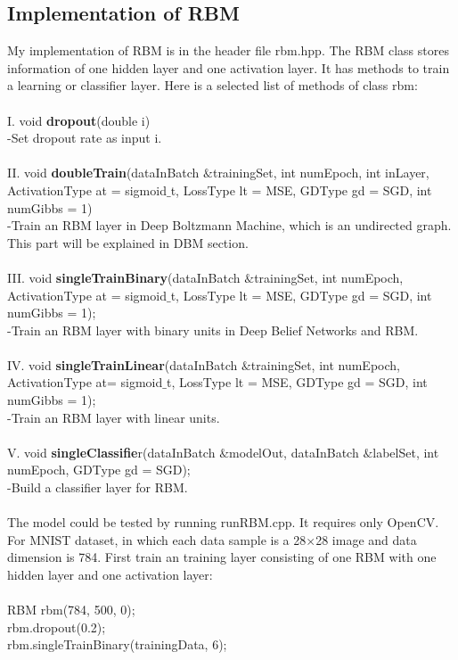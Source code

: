 \documentclass[12pt]{article}
\begin{document}
\subsection{Implementation of RBM}
My implementation of RBM is in the header file rbm.hpp. The RBM class stores information of one hidden layer and one activation layer. It has methods to train a learning or classifier layer. Here is a selected list of methods of class rbm:\\
\\
I. void \textbf{dropout}(double i)\\
-Set dropout rate as input i.\\
\\
II. void \textbf{doubleTrain}(dataInBatch $\&$trainingSet, int numEpoch, int inLayer, ActivationType at = sigmoid$\_$t, LossType lt = MSE, GDType gd = SGD, int numGibbs = 1)\\
-Train an RBM layer in Deep Boltzmann Machine, which is an undirected graph. This part will be explained in DBM section.\\
\\
III. void \textbf{singleTrainBinary}(dataInBatch $\&$trainingSet, int numEpoch, ActivationType at = sigmoid$\_$t, LossType lt = MSE, GDType gd = SGD, int numGibbs = 1);\\
-Train an RBM layer with binary units in Deep Belief Networks and RBM.\\
\\
IV. void \textbf{singleTrainLinear}(dataInBatch $\&$trainingSet, int numEpoch, ActivationType at= sigmoid$\_$t, LossType lt = MSE, GDType gd = SGD, int numGibbs = 1);\\
-Train an RBM layer with linear units.\\
\\
V. void \textbf{singleClassifie}r(dataInBatch $\&$modelOut, dataInBatch $\&$labelSet, int numEpoch, GDType gd = SGD);\\
-Build a classifier layer for RBM.\\
\\
The model could be tested by running runRBM.cpp. It requires only OpenCV. For MNIST dataset, in which each data sample is a 28$\times$28 image and data dimension is 784. First train an training layer consisting of one RBM with one hidden layer and one activation layer:\\
\\
RBM rbm(784, 500, 0);\\
rbm.dropout(0.2);\\
rbm.singleTrainBinary(trainingData, 6);\\
\end{document}
